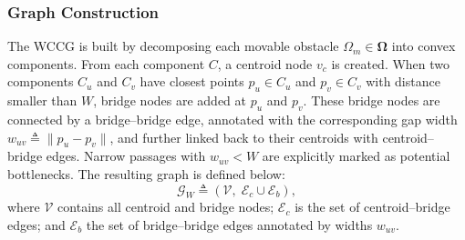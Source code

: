 \subsubsection{Graph Construction}
The WCCG is built by decomposing each movable obstacle
$\Omega_m\in\boldsymbol{\Omega}$ into convex components. From each component
$C$, a centroid node $v_c$ is created. When two components $C_u$ and $C_v$
have closest points $p_u\in C_u$ and $p_v\in C_v$ with distance smaller than
$W$, bridge nodes are added at $p_u$ and $p_v$. These bridge nodes are
connected by a bridge--bridge edge, annotated with the corresponding gap width
$w_{uv}\triangleq\|p_u-p_v\|$, and further linked back to their centroids with
centroid--bridge edges. Narrow passages with $w_{uv}<W$ are explicitly marked
as potential bottlenecks. The resulting graph is defined below:
\begin{equation}\label{eq:wccg}
\mathcal{G}_W\triangleq(\mathcal{V},\; \mathcal{E}_c\cup\mathcal{E}_b),
\end{equation}
where $\mathcal{V}$ contains all centroid and bridge nodes;
$\mathcal{E}_c$ is the set of centroid--bridge edges; and $\mathcal{E}_b$ the
set of bridge--bridge edges annotated by widths $w_{uv}$.

